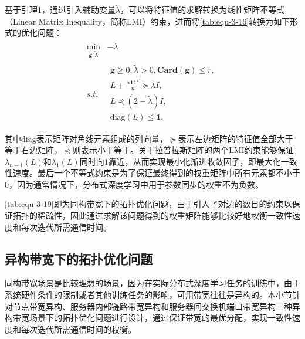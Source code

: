 基于引理1，通过引入辅助变量$\tilde{\lambda}$，可以将特征值的求解转换为线性矩阵不等式（Linear Matrix Inequality，简称LMI）约束，进而将\autoref{tab:equ-3-16}转换为如下形式的优化问题：
\begin{equation}
    \label{tab:equ-3-19}
    \begin{matrix}
        \underset{\mathbf{g},\tilde{\lambda}}{\min}&		-\tilde{\lambda}\\
        s.t.&		\begin{array}{c}
        \mathbf{g}\ge 0,\tilde{\lambda}>0,\mathbf{Card}\left( \mathbf{g} \right) \le r,\\
        L+\frac{\alpha \mathbf{1}\mathbf{1}^T}{n}\succeq \tilde{\lambda} I,\\
        L\curlyeqprec \left( 2-\tilde{\lambda} \right) I,\\
        \mathrm{diag}\left( L \right) \leqslant \mathbf{1}.\\
    \end{array}\\
    \end{matrix}
\end{equation}
其中$\mathrm{diag}$表示矩阵对角线元素组成的列向量，$\succeq$表示左边矩阵的特征值全部大于等于右边矩阵，$\curlyeqprec$则表示小于等于。关于拉普拉斯矩阵的两个LMI约束能够保证$\lambda _{n-1}\left( L \right)$和$\lambda _1\left( L \right)$同时向1靠近，从而实现最小化渐进收敛因子，即最大化一致性速度。最后一个不等式约束是为了保证最终得到的权重矩阵中所有元素都不小于0，因为通常情况下，分布式深度学习中用于参数同步的权重不为负数。

\autoref{tab:equ-3-19}即为同构带宽下的拓扑优化问题，由于引入了对边的数目的约束以保证拓扑的稀疏性，因此通过求解该问题得到的权重矩阵能够比较好地权衡一致性速度和每次迭代所需通信时间。

\subsection{异构带宽下的拓扑优化问题}\label{subsection3-2-3}

同构带宽场景是比较理想的场景，因为在实际分布式深度学习任务的训练中，由于系统硬件条件的限制或者其他训练任务的影响，可用带宽往往是异构的。本小节针对节点带宽异构、服务器内部链路带宽异构和服务器间交换机端口带宽异构三种异构带宽场景下的拓扑优化问题进行设计，通过保证带宽的最优分配，实现一致性速度和每次迭代所需通信时间的权衡。

